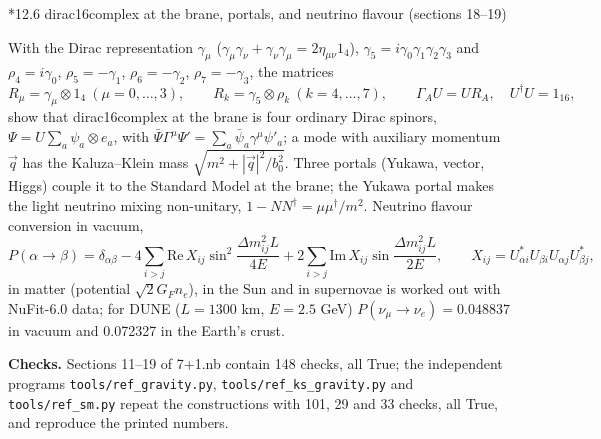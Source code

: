 \documentclass[10pt,a4paper]{article}
\makeatletter
\renewcommand\subsection{\@startsection{subsection}{2}{\z@}{-3.25ex\@plus -1ex \@minus -.2ex}{1.5ex \@plus .2ex}{\normalfont\large\bfseries\raggedright}}
\makeatother
\begin{document}
\subsection*{12.6 dirac16complex at the brane, portals, and neutrino flavour (sections 18–19)}
With the Dirac representation $\gamma_\mu$ ($\gamma_\mu\gamma_\nu+\gamma_\nu\gamma_\mu=2\eta_{\mu\nu}1_4$), $\gamma_5=i\gamma_0\gamma_1\gamma_2\gamma_3$ and $\rho_4=i\gamma_0$, $\rho_5=-\gamma_1$, $\rho_6=-\gamma_2$, $\rho_7=-\gamma_3$, the matrices
\begin{equation*}
R_\mu=\gamma_\mu\otimes1_4\ (\mu=0,\dots,3),\qquad R_k=\gamma_5\otimes\rho_k\ (k=4,\dots,7),\qquad \Gamma_AU=UR_A,\quad U^\dagger U=1_{16},
\end{equation*}
show that dirac16complex at the brane is four ordinary Dirac spinors, $\Psi=U\sum_a\psi_a\otimes e_a$, with $\bar\Psi\Gamma^\mu\Psi'=\sum_a\bar\psi_a\gamma^\mu\psi'_a$; a mode with auxiliary momentum $\vec q$ has the Kaluza–Klein mass $\sqrt{m^2+|\vec q|^2/b_0^2}$. Three portals (Yukawa, vector, Higgs) couple it to the Standard Model at the brane; the Yukawa portal makes the light neutrino mixing non-unitary, $1-NN^\dagger=\mu\mu^\dagger/m^2$. Neutrino flavour conversion in vacuum,
\begin{equation*}
P(\alpha\to\beta)=\delta_{\alpha\beta}-4\sum_{i>j}\mathrm{Re}\,X_{ij}\sin^2\frac{\Delta m^2_{ij}L}{4E}+2\sum_{i>j}\mathrm{Im}\,X_{ij}\sin\frac{\Delta m^2_{ij}L}{2E},\qquad X_{ij}=U^*_{\alpha i}U_{\beta i}U_{\alpha j}U^*_{\beta j},
\end{equation*}
in matter (potential $\sqrt2G_Fn_e$), in the Sun and in supernovae is worked out with NuFit-6.0 data; for DUNE ($L=1300$ km, $E=2.5$ GeV) $P(\nu_\mu\to\nu_e)=0.048837$ in vacuum and 0.072327 in the Earth’s crust.

\textbf{Checks.} Sections 11–19 of 7+1.nb contain 148 checks, all True; the independent programs \texttt{tools/\allowbreak{}ref\_\allowbreak{}gravity.py}, \texttt{tools/\allowbreak{}ref\_\allowbreak{}ks\_\allowbreak{}gravity.py} and \texttt{tools/\allowbreak{}ref\_\allowbreak{}sm.py} repeat the constructions with 101, 29 and 33 checks, all True, and reproduce the printed numbers.
\end{document}
